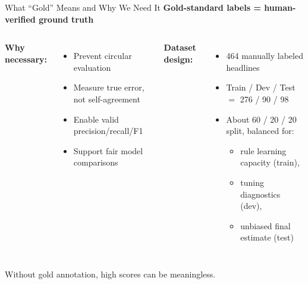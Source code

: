\documentclass[aspectratio=169, 11pt]{beamer}
\begin{document}
\begin{frame}{What ``Gold'' Means and Why We Need It}
  \textbf{Gold-standard labels = human-verified ground truth}

  \vspace{0.8em}

  \begin{columns}
    \textbf{Why necessary:}
    \begin{itemize}
      \item Prevent circular evaluation
      \item Measure true error, not self-agreement
      \item Enable valid precision/recall/F1
      \item Support fair model comparisons
    \end{itemize}

    \textbf{Dataset design:}
    \begin{itemize}
      \item 464 manually labeled headlines
      \item Train / Dev / Test $=$ 276 / 90 / 98
      \item About 60 / 20 / 20 split, balanced for:
      \begin{itemize}
        \item rule learning capacity (train),
        \item tuning diagnostics (dev),
        \item unbiased final estimate (test)
      \end{itemize}
    \end{itemize}
  \end{columns}

  \vspace{0.8em}

  \textcolor{accent}{Without gold annotation, high scores can be meaningless.}
\end{frame}
\end{document}
